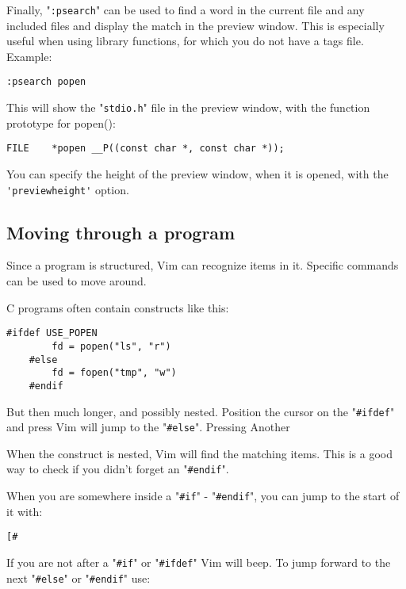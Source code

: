 Finally, "\verb!:psearch!" can be used to find a word in the current file and any included files and display the match in the preview window.
This is especially useful when using library functions, for which you do not have a tags file.
Example:

\begin{Verbatim}[samepage=true]
 :psearch popen
\end{Verbatim}

This will show the "\verb!stdio.h!" file in the preview window, with the function prototype for popen():

\begin{Verbatim}[samepage=true]
    FILE    *popen __P((const char *, const char *)); 
\end{Verbatim}

You can specify the height of the preview window, when it is opened, with the \verb!'previewheight'! option.
\subsection{Moving through a program}
Since a program is structured, Vim can recognize items in it.
Specific commands can be used to move around.

C programs often contain constructs like this:

\begin{Verbatim}[samepage=true]
    #ifdef USE_POPEN 
        fd = popen("ls", "r") 
    #else 
        fd = fopen("tmp", "w") 
    #endif 
\end{Verbatim}

But then much longer, and possibly nested.
Position the cursor on the "\verb!#ifdef!" and press %
Vim will jump to the "\verb!#else!".
Pressing %
Another %

When the construct is nested, Vim will find the matching items.
This is a good way to check if you didn't forget an "\verb!#endif!".

When you are somewhere inside a "\verb!#if!" - "\verb!#endif!", you can jump to the start of it with:

\begin{Verbatim}[samepage=true]
 [#
\end{Verbatim}

If you are not after a "\verb!#if!" or "\verb!#ifdef!" Vim will beep.
To jump forward to the next "\verb!#else!" or "\verb!#endif!" use:

